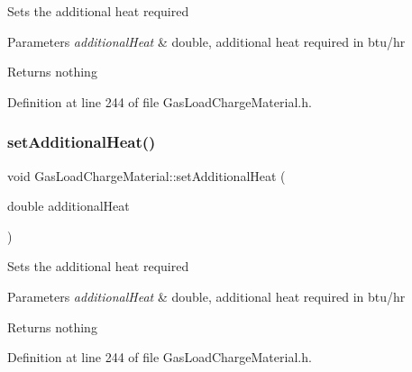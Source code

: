 Sets the additional heat required


\begin{DoxyParams}{Parameters}
{\em additional\+Heat} & double, additional heat required in btu/hr\\
\hline
\end{DoxyParams}
\begin{DoxyReturn}{Returns}
nothing 
\end{DoxyReturn}


Definition at line 244 of file Gas\+Load\+Charge\+Material.\+h.

\mbox{\label{class_gas_load_charge_material_a08ef5196ea9919dfc71be6744c7da08e}} 
\subsubsection{\texorpdfstring{set\+Additional\+Heat()}{setAdditionalHeat()}\hspace{0.1cm}{\footnotesize\ttfamily [3/3]}}
{\footnotesize\ttfamily void Gas\+Load\+Charge\+Material\+::set\+Additional\+Heat (\begin{DoxyParamCaption}\item[{double}]{additional\+Heat }\end{DoxyParamCaption})\hspace{0.3cm}{\ttfamily [inline]}}

Sets the additional heat required


\begin{DoxyParams}{Parameters}
{\em additional\+Heat} & double, additional heat required in btu/hr\\
\hline
\end{DoxyParams}
\begin{DoxyReturn}{Returns}
nothing 
\end{DoxyReturn}


Definition at line 244 of file Gas\+Load\+Charge\+Material.\+h.

\mbox{\label{class_gas_load_charge_material_a6c53344d5370a1e9b7321a530a6843c0}} 
